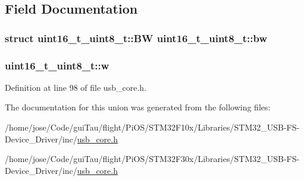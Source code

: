 \subsection{Field Documentation}
\hypertarget{unionuint16__t__uint8__t_a9bd9304e89c72f660cd8407fffe9f2b2}{
\subsubsection[{bw}]{\setlength{\rightskip}{0pt plus 5cm}struct {\bf uint16\-\_\-t\-\_\-uint8\-\_\-t\-::\-B\-W} uint16\-\_\-t\-\_\-uint8\-\_\-t\-::bw}}\label{unionuint16__t__uint8__t_a9bd9304e89c72f660cd8407fffe9f2b2}
\hypertarget{unionuint16__t__uint8__t_af420fddc8a5c2a365a3602226f4deafa}{
\subsubsection[{w}]{ uint16\-\_\-t\-\_\-uint8\-\_\-t\-::w}}\label{unionuint16__t__uint8__t_af420fddc8a5c2a365a3602226f4deafa}


Definition at line 98 of file usb\-\_\-core.\-h.



The documentation for this union was generated from the following files\-:\begin{DoxyCompactItemize}
\item 
/home/jose/\-Code/gui\-Tau/flight/\-Pi\-O\-S/\-S\-T\-M32\-F10x/\-Libraries/\-S\-T\-M32\-\_\-\-U\-S\-B-\/\-F\-S-\/\-Device\-\_\-\-Driver/inc/\hyperlink{_s_t_m32_f10x_2_libraries_2_s_t_m32___u_s_b-_f_s-_device___driver_2inc_2usb__core_8h}{usb\-\_\-core.\-h}\item 
/home/jose/\-Code/gui\-Tau/flight/\-Pi\-O\-S/\-S\-T\-M32\-F30x/\-Libraries/\-S\-T\-M32\-\_\-\-U\-S\-B-\/\-F\-S-\/\-Device\-\_\-\-Driver/inc/\hyperlink{_s_t_m32_f30x_2_libraries_2_s_t_m32___u_s_b-_f_s-_device___driver_2inc_2usb__core_8h}{usb\-\_\-core.\-h}\end{DoxyCompactItemize}
